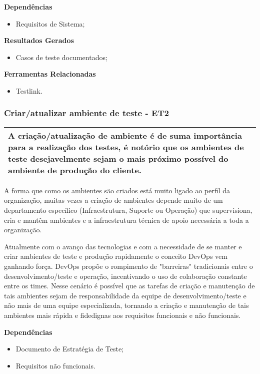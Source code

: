 \textbf{Dependências}
\begin{itemize}
    \item Requisitos de Sistema;
\end{itemize}

\textbf{Resultados Gerados}
\begin{itemize}
    \item  Casos de teste documentados;
\end{itemize}

\textbf{Ferramentas Relacionadas}
\begin{itemize}
    \item Testlink.
\end{itemize}

\subsubsection{Criar/atualizar ambiente de teste - ET2}
\label{sec:et2}

\begin{table}[!ht]
\centering
\begin{tabular}{|p{130mm}|}
\hline
A criação/atualização de ambiente é de suma importância para a realização dos testes, é notório que os ambientes de teste desejavelmente sejam o mais próximo possível do ambiente de produção do cliente. \\ 
\hline
\end{tabular}
\end{table}

A forma que como os ambientes são criados está muito ligado ao perfil da organização, muitas vezes a criação de ambientes depende muito de um departamento específico (Infraestrutura, Suporte ou Operação) que supervisiona, cria e mantêm ambientes e a infraestrutura técnica de apoio necessária a toda a organização.

Atualmente com o avanço das tecnologias e com a necessidade de se manter e criar ambientes de teste e produção rapidamente o conceito DevOps vem ganhando força. DevOps propõe o rompimento de "barreiras" tradicionais entre o desenvolvimento/teste e operação, incentivando o uso de colaboração constante entre os times. Nesse cenário é possível que as tarefas de criação e manutenção de tais ambientes sejam de responsabilidade da equipe de desenvolvimento/teste e não mais de uma equipe especializada, tornando a criação e manutenção de tais ambientes mais rápida e fidedignas aos requisitos funcionais e não funcionais.

\textbf{Dependências}
\begin{itemize}
    \item Documento de Estratégia de Teste;
    \item Requisitos não funcionais.
\end{itemize}


